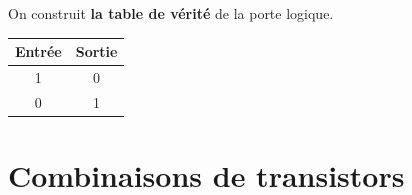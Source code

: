 \documentclass[svgnames,11pt]{beamer}
\begin{document}
\begin{frame}
    \frametitle{}
    \begin{aretenir}[]
        On construit \textbf{la table de vérité} de la porte logique.
    \end{aretenir}
    \begin{center}
        \begin{tabular}{|c|c|}
            \hline
            Entrée & Sortie \\
            \hline
            1      & 0      \\
            \hline
            0      & 1      \\
            \hline
        \end{tabular}
    \end{center}

\end{frame}
\section{Combinaisons de transistors}
\end{document}
